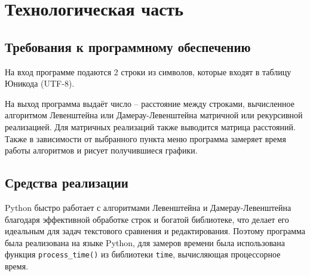 \documentclass[a4paper,12pt]{article}
\begin{document}
\section{Технологическая часть}
\subsection{Требования к программному обеспечению}
На вход программе подаются 2 строки из символов, которые входят в таблицу Юникода (UTF-8).\par
На выход программа выдаёт число – расстояние между строками, вычисленное алгоритмом Левенштейна или Дамерау-Левенштейна матричной или рекурсивной реализацией. Для матричных реализаций также выводится матрица расстояний. Также в зависимости от выбранного пункта меню программа замеряет время работы алгоритмов и рисует получившиеся графики.
\subsection{Средства реализации}
Python быстро работает с алгоритмами Левенштейна и Дамерау-Левенштейна благодаря эффективной обработке строк и богатой библиотеке, что делает его идеальным для задач текстового сравнения и редактирования. Поэтому программа была реализована на языке Python, для замеров времени была использована функция \texttt{process\_time()} из библиотеки \texttt{time}, вычисляющая процессорное время\cite{process_time}.
\end{document}
